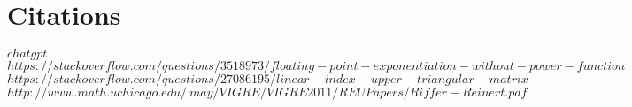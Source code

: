 \documentclass[11pt]{article}
\begin{document}
\newpage
\section*{Citations}
\rbrack \hspace{1mm} $chatgpt$\\
\rbrack \hspace{1mm} $https://stackoverflow.com/questions/3518973/floating-point-exponentiation-without-power-function$\\
\rbrack \hspace{1mm} $https://stackoverflow.com/questions/27086195/linear-index-upper-triangular-matrix$\\
\rbrack \hspace{1mm} $http://www.math.uchicago.edu/~may/VIGRE/VIGRE2011/REUPapers/Riffer-Reinert.pdf$
\end{document}
